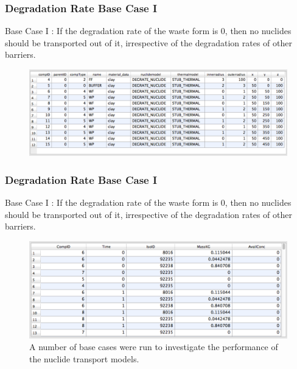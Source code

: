 \begin{frame}
  \frametitle{Degradation Rate Base Case I}
  Base Case I : If the degradation rate of the waste form is 0, then no nuclides should be 
  transported out of it, irrespective of the degradation rates of other 
  barriers. 

  \begin{figure}[htbp!]
    \begin{center}
      \includegraphics[width=\textwidth]{cyder/images/stub_0deg_comp_table.eps}
    \end{center}
  \end{figure}
\end{frame}

\begin{frame}
  \frametitle{Degradation Rate Base Case I}
  Base Case I : If the degradation rate of the waste form is 0, then no nuclides should be 
  transported out of it, irrespective of the degradation rates of other 
  barriers. 

  \begin{figure}[htbp!]
    \begin{center}
      \includegraphics[width=\textwidth]{cyder/images/stub_0deg_cont_table.eps}
      \caption{A number of base cases were run to investigate the performance of 
      the nuclide transport models.}
    \end{center}
  \end{figure}
\end{frame}

